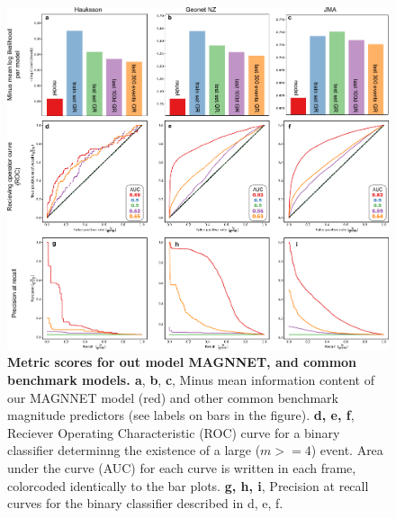 \documentclass[pdflatex]{sn-jnl}
\begin{document}
\begin{figure}[h!]
    \centering
    \includegraphics[width=1\textwidth]{figures/combined_batplots.pdf}
    \caption{
        \textbf{Metric scores for out model MAGNNET, and common benchmark models. a}, \textbf{b}, \textbf{c}, Minus mean information content of our MAGNNET model (red) and other common benchmark magnitude predictors (see labels on bars in the figure). \textbf{d, e, f}, Reciever Operating Characteristic (ROC) curve for a binary classifier determinng the existence of a large ($m>=4$) event. Area under the curve (AUC) for each curve is written in each frame, colorcoded identically to the bar plots. \textbf{g, h, i}, Precision at recall curves for the binary classifier described in d, e, f. 
        }
        \label{fig:metrics}
\end{figure}
\end{document}
